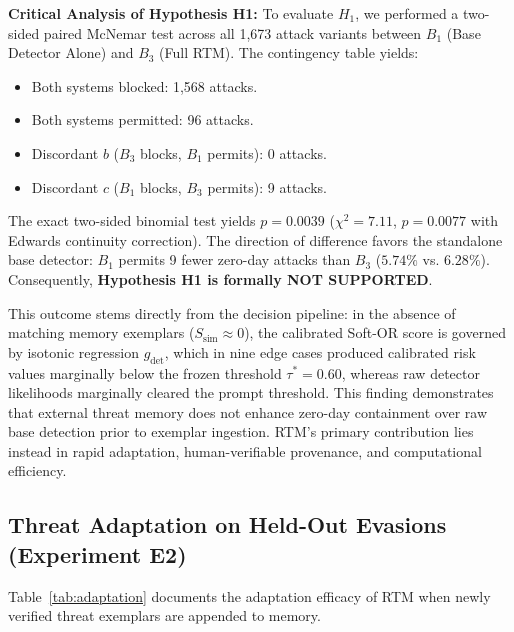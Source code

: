 \documentclass[conference]{IEEEtran}
\begin{document}
\noindent\textbf{Critical Analysis of Hypothesis H1:}
To evaluate $H_1$, we performed a two-sided paired McNemar test across all 1,673 attack variants between $B_1$ (Base Detector Alone) and $B_3$ (Full RTM). The contingency table yields:
\begin{itemize}
    \item Both systems blocked: 1,568 attacks.
    \item Both systems permitted: 96 attacks.
    \item Discordant $b$ ($B_3$ blocks, $B_1$ permits): 0 attacks.
    \item Discordant $c$ ($B_1$ blocks, $B_3$ permits): 9 attacks.
\end{itemize}
The exact two-sided binomial test yields $p = 0.0039$ ($\chi^2 = 7.11$, $p = 0.0077$ with Edwards continuity correction). The direction of difference favors the standalone base detector: $B_1$ permits 9 fewer zero-day attacks than $B_3$ ($5.74\%$ vs. $6.28\%$). Consequently, \textbf{Hypothesis H1 is formally NOT SUPPORTED}.

This outcome stems directly from the decision pipeline: in the absence of matching memory exemplars ($S_{\text{sim}} \approx 0$), the calibrated Soft-OR score is governed by isotonic regression $g_{\text{det}}$, which in nine edge cases produced calibrated risk values marginally below the frozen threshold $\tau^* = 0.60$, whereas raw detector likelihoods marginally cleared the prompt threshold. This finding demonstrates that external threat memory does not enhance zero-day containment over raw base detection prior to exemplar ingestion. RTM's primary contribution lies instead in rapid adaptation, human-verifiable provenance, and computational efficiency.

\subsection{Threat Adaptation on Held-Out Evasions (Experiment E2)}
Table~\ref{tab:adaptation} documents the adaptation efficacy of RTM when newly verified threat exemplars are appended to memory.
\end{document}
